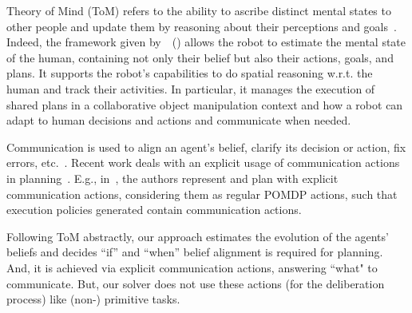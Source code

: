 \documentclass[letterpaper]{article} %
\begin{document}
Theory of Mind (ToM) refers to the ability to ascribe distinct mental states to other people and update them by reasoning about their perceptions and goals~\cite{baron1985does}.
Indeed, the framework given by~\citeauthor{devin2016implemented}~(\citeyear{devin2016implemented}) allows the robot to estimate the mental state of the human, containing not only their belief but also their actions, goals, and plans. It supports the robot's capabilities to do spatial reasoning w.r.t. the human and track their activities. In particular, it manages the execution of shared plans in a collaborative object manipulation context and how a robot can adapt to human decisions and actions and communicate when needed.


Communication 
is used to align an agent's belief, clarify its decision or action, fix errors, etc.~\cite{tellex2014asking,sebastiani2017dealing}. 
Recent work deals with an explicit usage of communication actions in planning~\cite{BuisanSA20,nikolaidis2018planning,roncone2017transparent,sanelli2017short,UnhelkarLS20}. 
E.g., in~\cite{roncone2017transparent,UnhelkarLS20}, the authors represent and plan with explicit communication actions, considering them as regular POMDP actions, such that execution policies generated contain communication actions.

Following ToM abstractly, our approach estimates the evolution of the agents' beliefs and decides ``if'' and ``when'' belief alignment is required for planning. 
And, it is achieved via explicit communication actions, answering ``what" to communicate. 
But, our solver does not use these actions (for the deliberation process) like (non-) primitive tasks.
\end{document}
